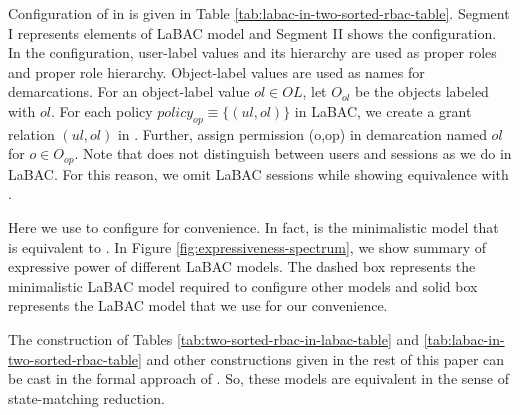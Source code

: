  
 
 
 
 Configuration of \hlabac{} in \twoSortedRBAC{} is given in Table \ref{tab:labac-in-two-sorted-rbac-table}. Segment I represents elements of LaBAC model and Segment II shows the configuration.  In the configuration, user-label values and its hierarchy are used as proper roles and proper role hierarchy. Object-label values are used as names for demarcations. For an object-label value $ol\in OL$, let $O_{ol}$ be the objects labeled with $ol$. For each policy $policy_{op} \equiv \{(ul, ol)\}$ in LaBAC, we create a grant relation $(ul,ol)$ in \twoSortedRBAC{}. Further, assign permission (o,op) in demarcation named $ol$ for $o \in O_{op}$. Note that \twoSortedRBAC{} does not distinguish between users and sessions as we do in LaBAC. For this reason, we omit LaBAC sessions while showing equivalence with \twoSortedRBAC{}.
 
 
 

  
  Here we use \hlabac{} to configure \twoSortedRBAC{} for convenience. In fact,  \clabac{} is the minimalistic model that is equivalent to \twoSortedRBAC{}. In Figure \ref{fig:expressiveness-spectrum}, we show summary of expressive power of different LaBAC models. The dashed box represents the minimalistic LaBAC model required to configure other models and solid box represents the LaBAC model that we use for our convenience. 


The construction of Tables \ref{tab:two-sorted-rbac-in-labac-table} and \ref{tab:labac-in-two-sorted-rbac-table} and other constructions given in the rest of this paper can be cast in the formal approach of \cite{tripli}. So, these models are equivalent in the sense of state-matching reduction. 

  
 
